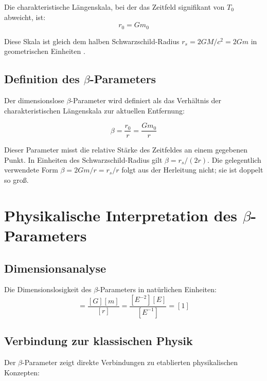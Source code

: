 	Die charakteristische Längenskala, bei der das Zeitfeld signifikant von $T_0$ abweicht, ist:
	\begin{equation}
		\boxed{r_0 = G m_0}
	\end{equation}
	
	Diese Skala ist gleich dem halben Schwarzschild-Radius $r_s = 2GM/c^2 = 2Gm$ in geometrischen Einheiten \citep{misner1973,carroll2004}.
	
	\subsection{Definition des $\beta$-Parameters}
	\label{subsec:beta_definition}
	
	Der dimensionslose $\beta$-Parameter wird definiert als das Verhältnis der charakteristischen Längenskala zur aktuellen Entfernung:
	
	\begin{equation}
		\boxed{\beta = \frac{r_0}{r} = \frac{G m_0}{r}}
	\end{equation}
	
	Dieser Parameter misst die relative Stärke des Zeitfeldes an einem gegebenen Punkt. In Einheiten des Schwarzschild-Radius gilt $\beta = r_s/(2r)$. Die gelegentlich verwendete Form $\beta = 2Gm/r = r_s/r$ folgt aus der Herleitung nicht; sie ist doppelt so groß.
	
	\section{Physikalische Interpretation des $\beta$-Parameters}
	\label{sec:physical_interpretation}
	
	\subsection{Dimensionsanalyse}
	\label{subsec:dimensional_analysis}
	
	Die Dimensionslosigkeit des $\beta$-Parameters in natürlichen Einheiten:
	\begin{equation}
		[\beta] = \frac{[G][m]}{[r]} = \frac{[E^{-2}][E]}{[E^{-1}]} = [1]
	\end{equation}
	
	\subsection{Verbindung zur klassischen Physik}
	\label{subsec:classical_connection}
	
	Der $\beta$-Parameter zeigt direkte Verbindungen zu etablierten physikalischen Konzepten:
	
